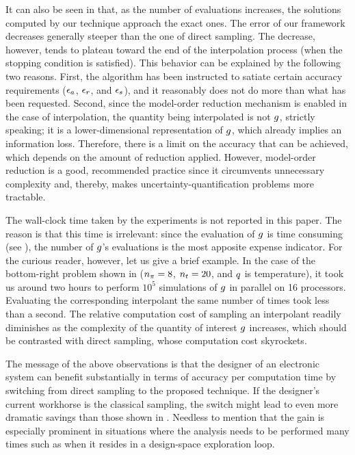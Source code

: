 It can also be seen in  that, as the number of evaluations
increases, the solutions computed by our technique approach the exact ones. The
error of our framework decreases generally steeper than the one of direct
sampling. The decrease, however, tends to plateau toward the end of the
interpolation process (when the stopping condition is satisfied). This behavior
can be explained by the following two reasons. First, the algorithm has been
instructed to satiate certain accuracy requirements ($\epsilon_a$, $\epsilon_r$, and
$\epsilon_s$), and it reasonably does not do more than what has been requested.
Second, since the model-order reduction mechanism is enabled in the case of
interpolation, the quantity being interpolated is not $g$, strictly speaking;
it is a lower-dimensional representation of $g$, which already implies an
information loss. Therefore, there is a limit on the accuracy that can be
achieved, which depends on the amount of reduction applied. However, model-order
reduction is a good, recommended practice since it circumvents unnecessary
complexity and, thereby, makes uncertainty-quantification problems more
tractable.

The wall-clock time taken by the experiments is not reported in this paper. The
reason is that this time is irrelevant: since the evaluation of $g$ is time
consuming (see ), the number of $g$'s evaluations is the most
apposite expense indicator. For the curious reader, however, let us give a brief
example. In the case of the bottom-right problem shown in  (${n_\pi} =
8$, ${n_t} = 20$, and $q$ is temperature), it took us around two hours to perform
$10^5$ simulations of $g$ in parallel on 16 processors. Evaluating the
corresponding interpolant the same number of times took less than a second. The
relative computation cost of sampling an interpolant readily diminishes as the
complexity of the quantity of interest $g$ increases, which should be
contrasted with direct sampling, whose computation cost skyrockets.

The message of the above observations is that the designer of an electronic
system can benefit substantially in terms of accuracy per computation time by
switching from direct sampling to the proposed technique. If the designer's
current workhorse is the classical  sampling, the switch might lead to
even more dramatic savings than those shown in . Needless to
mention that the gain is especially prominent in situations where the analysis
needs to be performed many times such as when it resides in a design-space
exploration loop.

